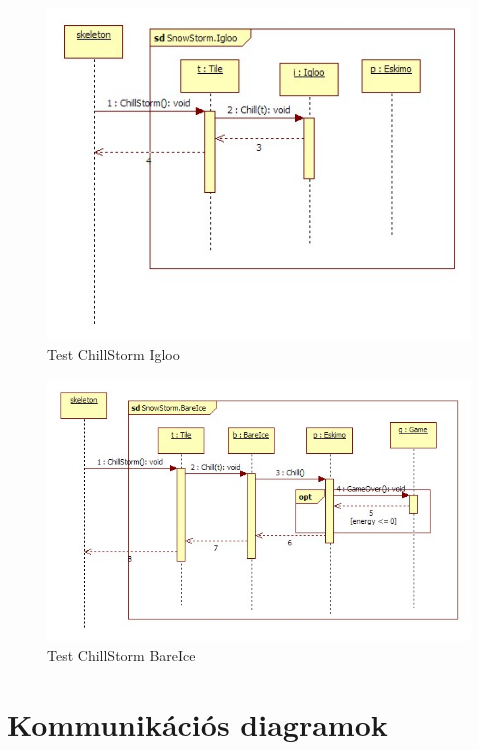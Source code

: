\begin{figure}[H]
	\begin{center}
		\includegraphics[width=13cm]{chapters/chapter05/diagrams/Test_ChillStorm_Igloo.jpg}
		\caption{Test ChillStorm Igloo}
		\label{fig:Test ChillStorm Igloo}
	\end{center}
\end{figure}

\begin{figure}[H]
	\begin{center}
		\includegraphics[width=17cm]{chapters/chapter05/diagrams/Test_ChillStorm_BareIce.jpg}
		\caption{Test ChillStorm BareIce}
		\label{fig:Test ChillStorm BareIce}
	\end{center}
\end{figure}


\pagebreak
\section{Kommunikációs diagramok}

